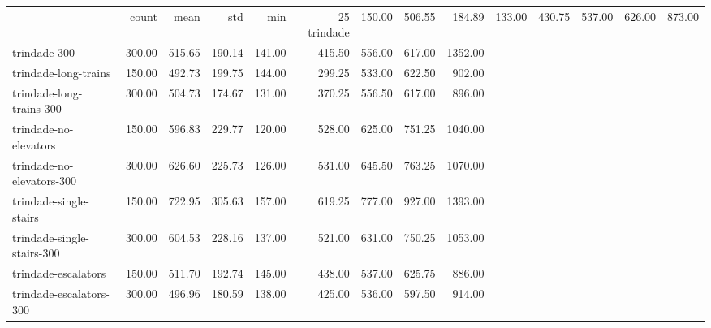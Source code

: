 \begin{tabular}{lrrrrrrrr}
 & count & mean & std & min & 25%
trindade & 150.00 & 506.55 & 184.89 & 133.00 & 430.75 & 537.00 & 626.00 & 873.00 \\
trindade-300 & 300.00 & 515.65 & 190.14 & 141.00 & 415.50 & 556.00 & 617.00 & 1352.00 \\
trindade-long-trains & 150.00 & 492.73 & 199.75 & 144.00 & 299.25 & 533.00 & 622.50 & 902.00 \\
trindade-long-trains-300 & 300.00 & 504.73 & 174.67 & 131.00 & 370.25 & 556.50 & 617.00 & 896.00 \\
trindade-no-elevators & 150.00 & 596.83 & 229.77 & 120.00 & 528.00 & 625.00 & 751.25 & 1040.00 \\
trindade-no-elevators-300 & 300.00 & 626.60 & 225.73 & 126.00 & 531.00 & 645.50 & 763.25 & 1070.00 \\
trindade-single-stairs & 150.00 & 722.95 & 305.63 & 157.00 & 619.25 & 777.00 & 927.00 & 1393.00 \\
trindade-single-stairs-300 & 300.00 & 604.53 & 228.16 & 137.00 & 521.00 & 631.00 & 750.25 & 1053.00 \\
trindade-escalators & 150.00 & 511.70 & 192.74 & 145.00 & 438.00 & 537.00 & 625.75 & 886.00 \\
trindade-escalators-300 & 300.00 & 496.96 & 180.59 & 138.00 & 425.00 & 536.00 & 597.50 & 914.00 \\
\end{tabular}
